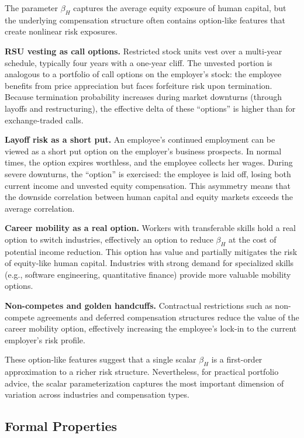 \documentclass[11pt]{article}
\begin{document}
The parameter $\beta_H$ captures the average equity exposure of human
capital, but the underlying compensation structure often contains
option-like features that create nonlinear risk exposures.

\textbf{RSU vesting as call options.} Restricted stock units vest
over a multi-year schedule, typically four years with a one-year cliff.
The unvested portion is analogous to a portfolio of call options on the
employer's stock: the employee benefits from price appreciation but faces
forfeiture risk upon termination. Because termination probability increases
during market downturns (through layoffs and restructuring), the
effective delta of these ``options'' is higher than for exchange-traded
calls.

\textbf{Layoff risk as a short put.} An employee's continued
employment can be viewed as a short put option on the employer's business
prospects. In normal times, the option expires worthless, and the employee
collects her wages. During severe downturns, the ``option'' is exercised:
the employee is laid off, losing both current income and unvested equity
compensation. This asymmetry means that the downside correlation between
human capital and equity markets exceeds the average correlation.

\textbf{Career mobility as a real option.} Workers with transferable
skills hold a real option to switch industries, effectively an option
to reduce $\beta_H$ at the cost of potential income reduction. This
option has value and partially mitigates the risk of equity-like human
capital. Industries with strong demand for specialized skills (e.g.,
software engineering, quantitative finance) provide more valuable mobility
options.

\textbf{Non-competes and golden handcuffs.} Contractual restrictions
such as non-compete agreements and deferred compensation structures reduce
the value of the career mobility option, effectively increasing the
employee's lock-in to the current employer's risk profile.

These option-like features suggest that a single scalar $\beta_H$ is a
first-order approximation to a richer risk structure. Nevertheless, for
practical portfolio advice, the scalar parameterization captures the most
important dimension of variation across industries and compensation types.

\subsection{Formal Properties}\label{sec:properties}
\end{document}
